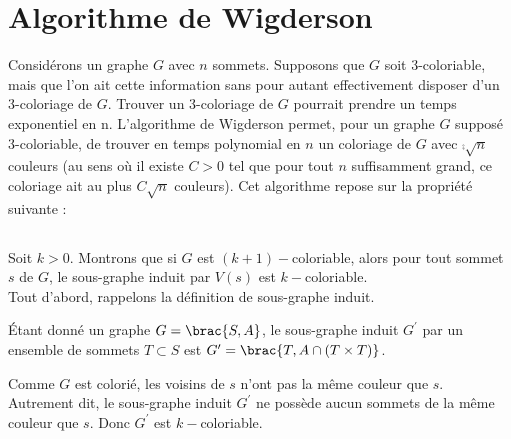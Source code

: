 \section{Algorithme de Wigderson}

\setcounter{subsection}{12}

Considérons un graphe $G$ avec $n$ sommets. Supposons que $G$ soit 3-coloriable, mais que l’on
ait cette information sans pour autant effectivement disposer d’un 3-coloriage de $G$. Trouver un
3-coloriage de $G$ pourrait prendre un temps exponentiel en n.
L’algorithme de Wigderson permet, pour un graphe $G$ supposé 3-coloriable, de trouver en
temps polynomial en $n$ un coloriage de $G$ avec $\comp{\sqrt{n}}$ couleurs (au sens où il existe $C > 0$ tel
que pour tout $n$ suffisamment grand, ce coloriage ait au plus $C\sqrt{n}$ couleurs). Cet algorithme repose sur la propriété suivante : 


\subsection{}
Soit $k>0$. Montrons que si $G$ est $(k+1)-$coloriable, alors pour tout sommet $s$ de $G$, le sous-graphe induit par $V(s)$ est $k-$coloriable.\\
Tout d'abord, rappelons la définition de sous-graphe induit.
\\
\begin{definition}
    \'Etant donné un graphe $G = \brac{S,A}$, le sous-graphe induit $G^\prime$ par un ensemble de sommets $T \subset S$ est $G^\prime = \brac{T, A \cap (T \times T)}$.
\end{definition}
\noindent
Comme $G$ est colorié, les voisins de $s$ n'ont pas la même couleur que $s$. Autrement dit, le sous-graphe induit $G^\prime$ ne possède aucun sommets de la même couleur que $s$. Donc $G^\prime$ est $k-$coloriable.

\subsection{}

